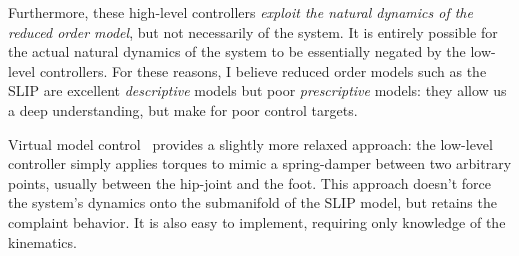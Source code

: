 Furthermore, these high-level controllers \emph{exploit the natural dynamics of the reduced order model}, but not necessarily of the system. It is entirely possible for the actual natural dynamics of the system to be essentially negated by the low-level controllers.
For these reasons, I believe reduced order models such as the SLIP are excellent \emph{descriptive} models but poor \emph{prescriptive} models: they allow us a deep understanding, but make for poor control targets. \par
Virtual model control~\cite{pratt2001virtual,renjewski2015exciting} provides a slightly more relaxed approach: the low-level controller simply applies torques to mimic a spring-damper between two arbitrary points, usually between the hip-joint and the foot. This approach doesn't force the system's dynamics onto the submanifold of the SLIP model, but retains the complaint behavior. It is also easy to implement, requiring only knowledge of the kinematics.


